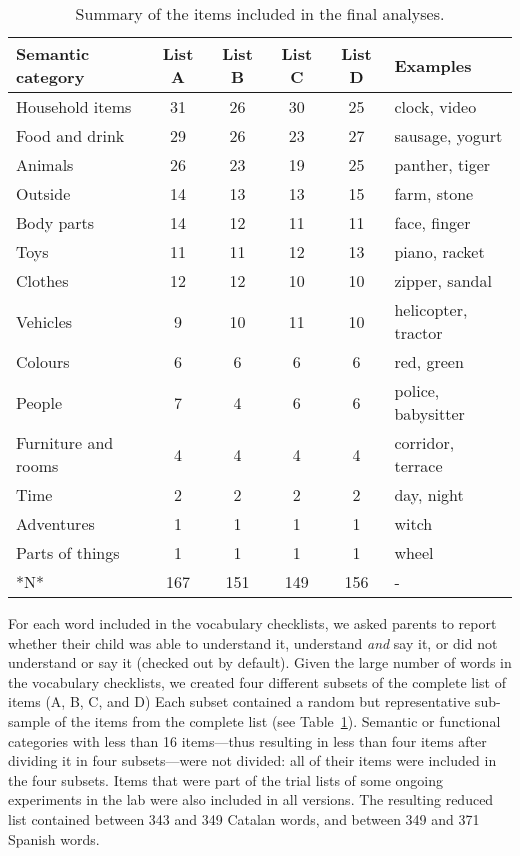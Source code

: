 \documentclass[
]{article}
\begin{document}
\hypertarget{tbl-items}{}
\begin{table}
\caption{\label{tbl-items}Summary of the items included in the final analyses. }\tabularnewline

\centering
\begin{tabular}{lccccl}
\toprule
Semantic category & List A & List B & List C & List D & Examples\\
\midrule
Household items & 31 & 26 & 30 & 25 & clock, video\\
Food and drink & 29 & 26 & 23 & 27 & sausage, yogurt\\
Animals & 26 & 23 & 19 & 25 & panther, tiger\\
Outside & 14 & 13 & 13 & 15 & farm, stone\\
Body parts & 14 & 12 & 11 & 11 & face, finger\\
\addlinespace
Toys & 11 & 11 & 12 & 13 & piano, racket\\
Clothes & 12 & 12 & 10 & 10 & zipper, sandal\\
Vehicles & 9 & 10 & 11 & 10 & helicopter, tractor\\
Colours & 6 & 6 & 6 & 6 & red, green\\
People & 7 & 4 & 6 & 6 & police, babysitter\\
\addlinespace
Furniture and rooms & 4 & 4 & 4 & 4 & corridor, terrace\\
Time & 2 & 2 & 2 & 2 & day, night\\
Adventures & 1 & 1 & 1 & 1 & witch\\
Parts of things & 1 & 1 & 1 & 1 & wheel\\
\midrule
*N* & 167 & 151 & 149 & 156 & -\\
\bottomrule
\end{tabular}
\end{table}

For each word included in the vocabulary checklists, we asked parents to
report whether their child was able to understand it, understand
\emph{and} say it, or did not understand or say it (checked out by
default). Given the large number of words in the vocabulary checklists,
we created four different subsets of the complete list of items (A, B,
C, and D) Each subset contained a random but representative sub-sample
of the items from the complete list (see Table~\ref{tbl-items}).
Semantic or functional categories with less than 16 items---thus
resulting in less than four items after dividing it in four
subsets---were not divided: all of their items were included in the four
subsets. Items that were part of the trial lists of some ongoing
experiments in the lab were also included in all versions. The resulting
reduced list contained between 343 and 349 Catalan words, and between
349 and 371 Spanish words.
\end{document}
